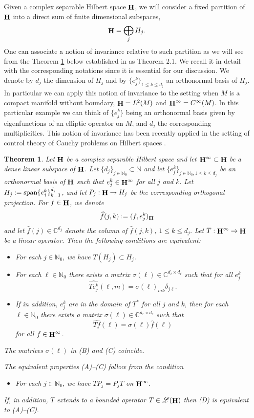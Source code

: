 \documentclass[a4paper,12pt,reqno]{amsart}
\newtheorem{thm}{Theorem}[section]
\theoremstyle{definition}
\theoremstyle{remark}
\numberwithin{equation}{section}
\newcommand{\ene}{\mathbb{N}}
\newcommand{\ce}{\mathbb{C}}
\def\N{{{\mathbb N}}}
\DeclareMathOperator{\Hi}{{\bf H}}
\DeclareMathOperator{\Hcal}{\bf H}
\begin{document}
Given a complex separable Hilbert space $\Hi$, we will  consider a fixed partition of $\Hi$ into a direct sum of finite dimensional subspaces,
$$\Hcal=\bigoplus_{j} H_{j}.$$
One can  associate a notion of invariance relative to such  partition as we will see from the Theorem \ref{THM:inv-rem} below established in \cite{fjdmr:foum} as Theorem 2.1. We recall it in detail with the corresponding notations since it is essential for our discussion. We denote by $d_j$ the dimension of  $H_{j}$ and by  $\{e_{j}^{k}\}_{1\leq k\leq d_{j}}$  an orthonormal basis of $ H_{j}$. In particular we can apply this notion of invariance to  the setting when $M$ is a compact manifold without boundary, $\Hcal=L^{2}(M)$ and $\Hcal^{\infty}=C^{\infty}(M)$. 
 In this particular example  we can
 think of $\{e_{j}^{k}\}$ being an orthonormal basis given by eigenfunctions
 of an elliptic operator on $M$, and $d_{j}$ the corresponding 
 multiplicities. This notion of invariance has been recently applied in the setting of control theory of Cauchy problems on Hilbert spaces \cite{CGDR:Hi}.  
 
\begin{thm}\label{THM:inv-rem}
	Let $\Hcal$ be a complex separable Hilbert space and let $\Hcal^{\infty}\subset \Hcal$ be a dense
	linear subspace of $\Hcal$. Let $\{d_{j}\}_{j\in\N_{0}}\subset\N$ and let
	$\{e_{j}^{k}\}_{j\in\N_{0}, 1\leq k\leq d_{j}}$ be an
	orthonormal basis of $\Hcal$ such that
	$e_{j}^{k}\in \Hcal^{\infty}$ for all $j$ and $k$. Let $H_{j}:={\rm span} \{e_{j}^{k}\}_{k=1}^{d_{j}}$,
	and let $P_{j}:\Hcal\to H_{j}$ be the corresponding orthogonal projection.
	For $f\in\Hcal$, we denote $$\widehat{f}(j,k):=(f,e_{j}^{k})_{\Hcal}$$ and let
	$\widehat{f}(j)\in \ce^{d_{j}}$ denote the column of $\widehat{f}(j,k)$, $1\leq k\leq d_{j}.$
	Let $T:\Hcal^{\infty}\to \Hcal$ be a linear operator.
	Then the following
	conditions are equivalent:
	\begin{itemize}
		\item[(A)] For each $j\in\ene_0$, we have $T(H_j)\subset H_j$. 
		\item[(B)] For each $\ell\in\ene_0$ there exists a matrix 
		$\sigma(\ell)\in\ce^{d_{\ell}\times d_{\ell}}$ such that for all $e_j^k$ 
		$$
		\widehat{Te_j^k}(\ell,m)=\sigma(\ell)_{mk}\delta_{j\ell}.
		$$
		\item[(C)]  If in addition, $e_j^k$ are in the domain of $T^*$ for all $j$ and $k$, then 
		for each $\ell\in\ene_0 $ there exists a matrix 
		$\sigma(\ell)\in\ce^{d_{\ell}\times d_{\ell}}$ such that
		\[\widehat{Tf}(\ell)=\sigma(\ell)\widehat{f}(\ell)\]
		for all $f\in\Hcal^{\infty}.$
	\end{itemize}
	
	The matrices $\sigma(\ell)$ in {\rm (B)} and {\rm (C)} coincide.
	
	The equivalent properties {\rm (A)--(C)} follow from the condition 
	\begin{itemize}
		\item[(D)] For each $j\in\ene_0$, we have
		$TP_j=P_jT$ on $\Hcal^{\infty}$.
	\end{itemize}
	If, in addition, $T$ extends to a bounded operator
	$T\in{\mathscr L}(\Hcal)$ then {\rm (D)} is equivalent to {\rm (A)--(C)}.
\end{thm} 
\end{document}
